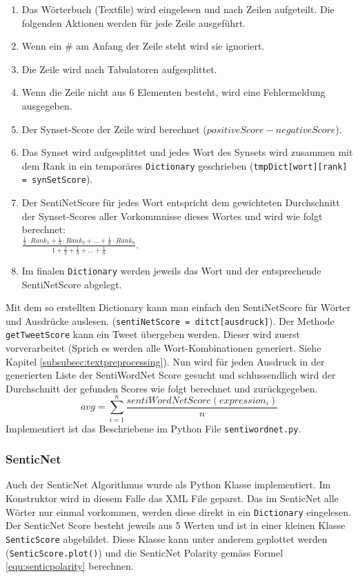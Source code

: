 \begin{enumerate}
	\item Das Wörterbuch (Textfile) wird eingelesen und nach Zeilen aufgeteilt. Die folgenden Aktionen werden für jede Zeile ausgeführt.
	\item Wenn ein \# am Anfang der Zeile steht wird sie ignoriert.
	\item Die Zeile wird nach Tabulatoren aufgesplittet.
	\item Wenn die Zeile nicht aus 6 Elementen besteht, wird eine Fehlermeldung ausgegeben.
	\item Der Synset-Score der Zeile wird berechnet ($positiveScore - negativeScore$).
	\item Das Synset wird aufgesplittet und jedes Wort des Synsets wird zusammen mit dem Rank in ein temporäres \lstinline$Dictionary$ geschrieben (\lstinline$tmpDict[wort][rank] = synSetScore$).
	\item Der SentiNetScore für jedes Wort entspricht dem gewichteten Durchschnitt der Synset-Scores aller Vorkommnisse dieses Wortes und wird wie folgt berechnet: \\ $\frac{\frac{1}{2}\cdot Rank_1 + \frac{1}{3} \cdot Rank_2 + ... + \frac{1}{n} \cdot Rank_n}{1+\frac{1}{2}+\frac{1}{3}+...+\frac{1}{n}}$.
	\item Im finalen \lstinline$Dictionary$ werden jeweils das Wort und der entsprechende SentiNetScore abgelegt.
\end{enumerate}

Mit dem so erstellten Dictionary kann man einfach den SentiNetScore für Wörter und Ausdrücke auslesen. (\lstinline$sentiNetScore = ditct[ausdruck]$). Der Methode \lstinline$getTweetScore$ kann ein Tweet übergeben werden. Dieser wird zuerst vorverarbeitet (Sprich es werden alle Wort-Kombinationen generiert. Siehe Kapitel \ref{subsubsec:textpreprocessing}). Nun wird für jeden Ausdruck in der generierten Liste der SentiWordNet Score gesucht und schlussendlich wird der Durchschnitt der gefunden Scores wie folgt berechnet und zurückgegeben.
\begin{equation}
avg = \sum_{i=1}^{n} \frac{sentiWordNetScore(expression_i)}{n}
\end{equation}
Implementiert ist das Beschriebene im Python File \lstinline$sentiwordnet.py$.

\subsubsection{SenticNet}
Auch der SenticNet Algorithmus wurde als Python Klasse implementiert. Im Konstruktor wird in diesem Falle das XML File geparst. Das im SenticNet alle Wörter nur einmal vorkommen, werden diese direkt in ein \lstinline$Dictionary$ eingelesen. Der SenticNet Score besteht jeweils aus 5 Werten und ist in einer kleinen Klasse \lstinline$SenticScore$ abgebildet. Diese Klasse kann unter anderem geplottet werden (\lstinline$SenticScore.plot()$) und die SenticNet Polarity gemäss Formel \ref{equ:senticpolarity} berechnen.

